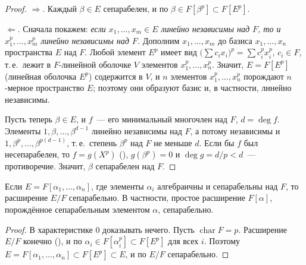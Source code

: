 \begin{proof}
$\Rightarrow$. Каждый $\beta\in E$ сепарабелен, и по  $\beta\in F[\beta^p]\subset F[E^p]$.

$\Leftarrow$. Сначала покажем: \emph{если $x_1,\dots,x_m\in E$ линейно независимы над $F$, то и $x_1^p,\dots,x_m^p$
линейно независимы над $F$.} Дополним $x_1,\dots,x_m$ до базиса $x_1,\dots,x_n$ пространства $E$ над $F$. Любой элемент
$E^p$ имеет вид $\bigl(\sum c_ix_i\bigr)^p=\sum c_i^px_i^p$, $c_i\in F$, т.\,е.\ лежит в $F$-линейной оболочке $V$
элементов $x_1^p,\dots,x_n^p$. Значит, $E=F[E^p]$ (линейная оболочка $E^p$) содержится в $V$, и $n$ элементов
$x_1^p,\dots,x_n^p$ порождают $n$-мерное пространство $E$; поэтому они образуют базис и, в частности, линейно
независимы.

Пусть теперь $\beta\in E$, и $f$~--- его минимальный многочлен над $F$, $d=\deg f$. Элементы $1,\beta,\dots,\beta^{d-1}$
линейно независимы над $F$, а потому независимы и $1,\beta^p,\dots,\beta^{p(d-1)}$, т.\,е.\ степень $\beta^p$ над $F$ не
меньше $d$. Если бы $f$ был несепарабелен, то $f=g(X^p)$ (), $g(\beta^p)=0$ и $\deg g=d/p<d$~--- противоречие.
Значит, $\beta$ сепарабелен над $F$.
\end{proof}

\begin{corollary}[2.22g]
Если $E=F[\alpha_1,\dots,\alpha_n]$, где элементы $\alpha_i$ алгебраичны и сепарабельны над $F$, то расширение $E/F$
сепарабельно. В частности, простое расширение $F[\alpha]$, порождённое сепарабельным элементом $\alpha$, сепарабельно.
\end{corollary}

\begin{proof}
В характеристике $0$ доказывать нечего. Пусть $\operatorname{char}F=p$. Расширение $E/F$ конечно (), и по 
$\alpha_i\in F[\alpha_i^p]\subset F[E^p]$ для всех $i$. Поэтому $E=F[\alpha_1,\dots,\alpha_n]\subset F[E^p]\subset E$, и
по  $E/F$ сепарабельно.
\end{proof}

